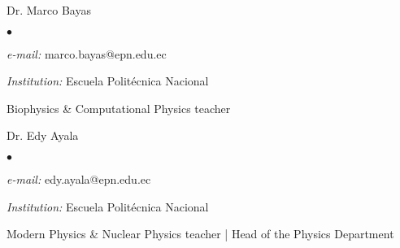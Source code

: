 \documentclass[margin,line]{res}
\newenvironment{list1}{
  \begin{list}{\ding{113}}{%
      \setlength{\itemsep}{0in}
      \setlength{\parsep}{0in} \setlength{\parskip}{0in}
      \setlength{\topsep}{0in} \setlength{\partopsep}{0in} 
      \setlength{\leftmargin}{0.17in}}}{\end{list}}
\newenvironment{list2}{
  \begin{list}{$\bullet$}{%
      \setlength{\itemsep}{0in}
      \setlength{\parsep}{0in} \setlength{\parskip}{0in}
      \setlength{\topsep}{0in} \setlength{\partopsep}{0in} 
      \setlength{\leftmargin}{0.2in}}}{\end{list}}
\begin{document}
\begin{resume}
  \begin{list1}
  \item[] Dr. Marco Bayas
  \begin{list2}
   \item {\it e-mail:} marco.bayas@epn.edu.ec
   \item {\it Institution:} Escuela Politécnica Nacional
   \item Biophysics \& Computational Physics teacher
  \end{list2}
 \end{list1}
%  

 \begin{list1}
  \item[] Dr. Edy Ayala
  \begin{list2}
   \item {\it e-mail:} edy.ayala@epn.edu.ec
   \item {\it Institution:} Escuela Politécnica Nacional
   \item Modern Physics \& Nuclear Physics teacher | Head of the Physics Department
  \end{list2}
 \end{list1}
 




\end{resume}
\end{document}
